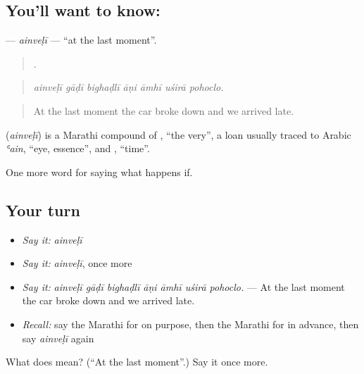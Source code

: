 \subsection*{You'll want to know: }
\textbf{} — \emph{ainveḷī} — \textquotedblleft{}at the last moment\textquotedblright{}.

\begin{quote}
      .
\end{quote}

\begin{quote}
\emph{ainveḷī gāḍī bighaḍlī āṇi āmhī uśirā pohoclo.}
\end{quote}

\begin{quote}
At the last moment the car broke down and we arrived late.
\end{quote}

\begin{cousinweb}
\textbf{} (\emph{ainveḷī}) is a Marathi compound of , \textquotedblleft{}the very\textquotedblright{}, a loan usually traced to Arabic \emph{ʿain}, \textquotedblleft{}eye, essence\textquotedblright{}, and , \textquotedblleft{}time\textquotedblright{}.
\end{cousinweb}

\begin{grammarlens}[title={What you've built}]
One more word for saying what happens if.
\end{grammarlens}

\subsection*{Your turn}
\begin{itemize}
\raggedright
  \item \emph{Say it:} \emph{ainveḷī}
  \item \emph{Say it:} \emph{ainveḷī}, once more
  \item \emph{Say it:} \emph{ainveḷī gāḍī bighaḍlī āṇi āmhī uśirā pohoclo.} — At the last moment the car broke down and we arrived late.
  \item \emph{Recall:} say the Marathi for on purpose, then the Marathi for in advance, then say \emph{ainveḷī} again
\end{itemize}

\begin{tcolorbox}[breakable,colback=teal!4,colframe=teal!35!black,title={Before you move on}]
What does  mean? (\textquotedblleft{}At the last moment\textquotedblright{}.) Say it once more.
\end{tcolorbox}
